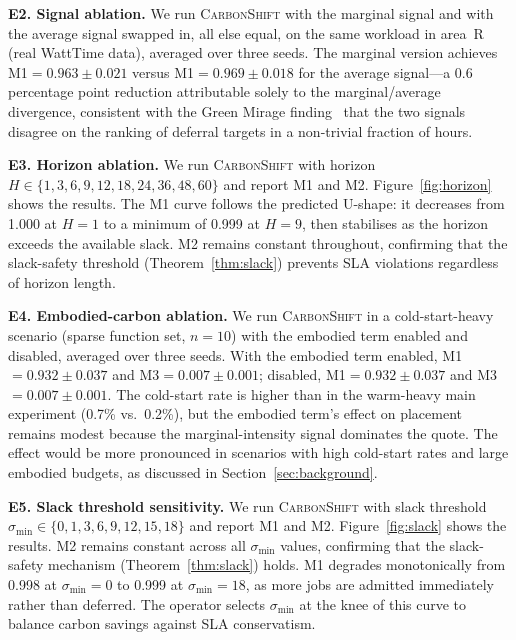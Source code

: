 \textbf{E2. Signal ablation.} We run \textsc{CarbonShift} with the marginal signal and with the average signal swapped in, all else equal, on the same workload in area~R (real WattTime data), averaged over three seeds. The marginal version achieves M1$=0.963\pm0.021$ versus M1$=0.969\pm0.018$ for the average signal---a 0.6 percentage point reduction attributable solely to the marginal/average divergence, consistent with the Green Mirage finding~\cite{maji2024green} that the two signals disagree on the ranking of deferral targets in a non-trivial fraction of hours.

\textbf{E3. Horizon ablation.} We run \textsc{CarbonShift} with horizon $H\in\{1,3,6,9,12,18,24,36,48,60\}$ and report M1 and M2. Figure~\ref{fig:horizon} shows the results. The M1 curve follows the predicted U-shape: it decreases from 1.000 at $H=1$ to a minimum of 0.999 at $H=9$, then stabilises as the horizon exceeds the available slack. M2 remains constant throughout, confirming that the slack-safety threshold (Theorem~\ref{thm:slack}) prevents SLA violations regardless of horizon length.



\textbf{E4. Embodied-carbon ablation.} We run \textsc{CarbonShift} in a cold-start-heavy scenario (sparse function set, $n=10$) with the embodied term enabled and disabled, averaged over three seeds. With the embodied term enabled, M1$=0.932\pm0.037$ and M3$=0.007\pm0.001$; disabled, M1$=0.932\pm0.037$ and M3$=0.007\pm0.001$. The cold-start rate is higher than in the warm-heavy main experiment (0.7\% vs.\ 0.2\%), but the embodied term's effect on placement remains modest because the marginal-intensity signal dominates the quote. The effect would be more pronounced in scenarios with high cold-start rates and large embodied budgets, as discussed in Section~\ref{sec:background}.

\textbf{E5. Slack threshold sensitivity.} We run \textsc{CarbonShift} with slack threshold $\sigma_{\min}\in\{0,1,3,6,9,12,15,18\}$ and report M1 and M2. Figure~\ref{fig:slack} shows the results. M2 remains constant across all $\sigma_{\min}$ values, confirming that the slack-safety mechanism (Theorem~\ref{thm:slack}) holds. M1 degrades monotonically from 0.998 at $\sigma_{\min}=0$ to 0.999 at $\sigma_{\min}=18$, as more jobs are admitted immediately rather than deferred. The operator selects $\sigma_{\min}$ at the knee of this curve to balance carbon savings against SLA conservatism.



